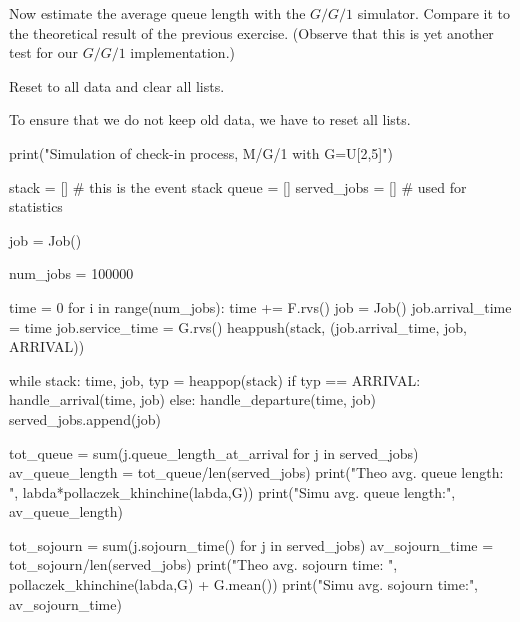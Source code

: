 \begin{exercise}
  Now estimate the average queue length with the $G/G/1$ simulator.
  Compare it to the theoretical result of the previous exercise.
  (Observe that this is yet another test for our $G/G/1$ implementation.)


  \begin{hint}
Reset to all data and clear all lists. 
  \end{hint}

  \begin{solution}
To ensure that we do not keep old data, we have to reset all lists. 

\begin{pyverbatim}
print("Simulation of check-in process, M/G/1 with G=U[2,5]")


stack = [] # this is the event stack
queue = []
served_jobs = [] # used for statistics

job = Job()

num_jobs = 100000

time = 0
for i in range(num_jobs):
    time += F.rvs()
    job = Job()
    job.arrival_time = time
    job.service_time = G.rvs()
    heappush(stack, (job.arrival_time, job, ARRIVAL))

while stack:
    time, job, typ = heappop(stack)
    if typ == ARRIVAL:
        handle_arrival(time, job)
    else:
        handle_departure(time, job)
        served_jobs.append(job)

tot_queue = sum(j.queue_length_at_arrival for j in served_jobs)
av_queue_length = tot_queue/len(served_jobs)
print("Theo avg. queue length: ", labda*pollaczek_khinchine(labda,G))
print("Simu avg. queue length:", av_queue_length)
      
tot_sojourn = sum(j.sojourn_time() for j in served_jobs)
av_sojourn_time = tot_sojourn/len(served_jobs)
print("Theo avg. sojourn time: ", pollaczek_khinchine(labda,G) + G.mean())
print("Simu avg. sojourn time:", av_sojourn_time)
  
\end{pyverbatim}

  \end{solution}

\end{exercise}

